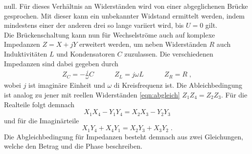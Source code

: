 null. Für dieses Verhältnis an Widerständen wird von einer abgeglichenen Brücke gesprochen. Mit dieser kann ein unbekannter Widstand 
ermittelt werden, indem mindestens einer der anderen drei so lange variiert wird, bis $U=0$ gilt. 
\\\noindent
Die Brückenschaltung kann nun für Wechselströme  auch auf komplexe Impedanzen $Z=X+jY$ erweitert werden, um neben Widerständen $R$ auch 
Induktivitäten $L$ und Kondensatoren $C$ zuzulassen. Die verschiedenen Impedanzen sind dabei gegeben durch
\begin{align*}
    Z_C=-\frac{j}{\omega}C \qquad\quad
    Z_L=j\omega L          \qquad\quad
    Z_R=R \;,
\end{align*}  
wobei $j$ ist imaginäre Einheit und $\omega$ di Kreisfrequenz ist. Die Ableichbedingung ist analog zu jener mit reellen Widerständen
\eqref{eqn:abgleich} $Z_1Z_4=Z_2Z_3$. Für die Realteile folgt demnach 
\begin{equation*}
    X_1X_4-Y_1Y_4=X_2X_3-Y_2Y_3
\end{equation*}
und für die Imaginärteile
\begin{equation*}
    X_1Y_4+X_4Y_1=X_2Y_3+X_3Y_2 \;.
\end{equation*}
Die Abgleichbedingung für Impedanzen besteht demnach aus zwei Gleichungen, welche den Betrag und die Phase beschreiben.

